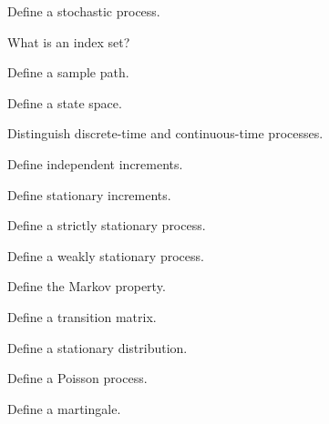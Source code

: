 \begin{exercise}[1]
Define a stochastic process.
\end{exercise}

\begin{exercise}[1]
What is an index set?
\end{exercise}

\begin{exercise}[1]
Define a sample path.
\end{exercise}

\begin{exercise}[1]
Define a state space.
\end{exercise}

\begin{exercise}[1]
Distinguish discrete-time and continuous-time processes.
\end{exercise}

\begin{exercise}[1]
Define independent increments.
\end{exercise}

\begin{exercise}[1]
Define stationary increments.
\end{exercise}

\begin{exercise}[1]
Define a strictly stationary process.
\end{exercise}

\begin{exercise}[1]
Define a weakly stationary process.
\end{exercise}

\begin{exercise}[1]
Define the Markov property.
\end{exercise}

\begin{exercise}[1]
Define a transition matrix.
\end{exercise}

\begin{exercise}[1]
Define a stationary distribution.
\end{exercise}

\begin{exercise}[1]
Define a Poisson process.
\end{exercise}

\begin{exercise}[1]
Define a martingale.
\end{exercise}


